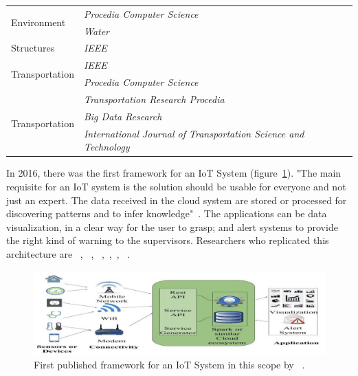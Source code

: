 \documentclass[a4paper,12pt,twoside]{ThesisStyle}
\begin{document}
\begin{longtable}{  l l l  }
\hline
\multirow{2}{*}{Environment}  &  \textit{Procedia Computer Science} &  ~\cite{vijai2016design} \\
\cline{2-3} 
 & \textit{Water} &  ~\cite{hangan2022advanced} \\
\hline
\multirow{1}{*}{Structures}  & \textit{IEEE} &  ~\cite{Zinno2022bridges} \\
\hline
\multirow{2}{*}{Transportation} & \textit{IEEE} & ~\cite{Wang2017Taxis}  \\
 \cline{2-3} 
& \multirow{1}{*}{\textit{Procedia Computer Science}} & ~\cite{killeen2019iot}  \\
 \multirow{4}{*}{Transportation} &  \multirow{1}{*}{\textit{Transportation Research Procedia}} & ~\cite{kyriakou2021vehicles}  \\
  \cline{2-3} 
 & \textit{Big Data Research} & ~\cite{bachechi2022big}  \\
   \cline{2-3} 
 & \parbox{5cm}{\textit{International Journal of Transportation Science and Technology}} & ~\cite{wu2023gtfs}  \\
\end{longtable}

In 2016, there was the first framework for an IoT System (figure~\ref{fig:firstIoTFramework}). "The main requisite for an IoT system is the solution should be usable for everyone and not just an expert. The data received in the cloud system are stored or processed for discovering patterns and to infer knowledge"~\cite{vijai2016design}. The applications can be data visualization, in a clear way for the user to grasp; and alert systems to provide the right kind of warning to the supervisors. Researchers who replicated this architecture are ~\cite{mohamudally2018building}, ~\cite{himeur2020data}, ~\cite{kyriakou2021vehicles},~\cite{bachechi2022big},~\cite{Zinno2022bridges}, ~\cite{alsalemi2023modular}.

\begin{figure}[htb]
\centering
\includegraphics[width=13 cm]{imatges/firstIoTFramework.png}
\caption{\label{fig:firstIoTFramework} First published  framework for an IoT System in this scope by ~\cite{vijai2016design}.}
\end{figure}
\end{document}
